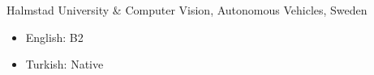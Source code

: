
{Halmstad University \& Computer Vision, Autonomous Vehicles, Sweden}

\smallskip

\begin{itemize}
    \item English: B2
    \item Turkish: Native
\end{itemize}
